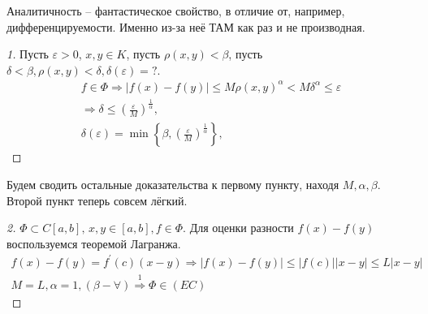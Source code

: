 \documentclass[document]{subfiles}
\begin{document}
Аналитичность -- фантастическое свойство, в отличие от, например, дифференцируемости. Именно из-за неё ТАМ как раз и не производная.

\begin{proof}[1]
    Пусть $\varepsilon > 0$, $x, y \in K$, пусть $\rho(x,y) < \beta$, пусть $\delta < \beta, \rho(x,y) < \delta, \delta(\varepsilon) = ?$. 
    \begin{gather*}
        f \in \Phi \Rightarrow |f(x) - f(y)| \leq M \rho(x,y)^\alpha < M \delta^\alpha \leq \varepsilon \\
        \Rightarrow \delta \leq \left( \frac{\varepsilon}{M} \right)^{\frac{1}{\alpha}}, \\
        \delta(\varepsilon) = \min \left\{ \beta, \left( \frac{\varepsilon}{M} \right)^{\frac{1}{\alpha}} \right\},
    \end{gather*}
\end{proof}

Будем сводить остальные доказательства к первому пункту, находя $M, \alpha, \beta$. Второй пункт теперь совсем лёгкий. 
\begin{proof}[2]
    $\Phi \subset C[a,b], \, x,y \in [a,b], f \in \Phi$. Для оценки разности $f(x) - f(y)$ воспользуемся теоремой Лагранжа. 
    \begin{multline*}
        f(x) - f(y) = f^\prime(c)(x-y) \Rightarrow |f(x) - f(y)| \leq |f(c)||x-y| \leq L|x-y| \\
        M = L, \alpha = 1, (\beta - \forall) \stackrel{1}{\Rightarrow} \Phi \in (EC)
    \end{multline*}
\end{proof}
\end{document}

